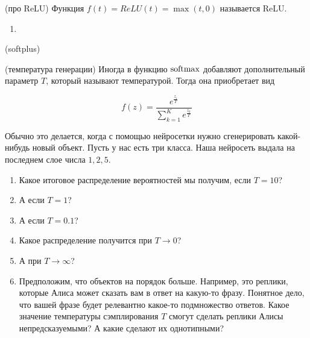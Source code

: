 \begin{problem}{(про ReLU)}
	Функция $f(t) = ReLU(t) = \max(t, 0)$ называется ReLU.
	\begin{enumerate}
        \item 
	\end{enumerate}
\end{problem} 





\begin{problem}{(softplus)}
\end{problem}




\begin{problem}{(температура генерации)}
	Иногда в функцию $\operatorname{softmax}$ добавляют дополнительный параметр $T$, который называют температурой. Тогда она приобретает вид 
	
	$$ 
	f(z) =  \frac{e^{\tfrac{z_i}{T}}}{ \sum_{k=1}^K e^{\tfrac{z_k}{T}}}
	$$

	Обычно это делается, когда с помощью нейросетки нужно сгенерировать какой-нибудь новый объект.  Пусть у нас есть три класса. Наша нейросеть выдала на последнем слое числа $1,2,5$. 

	\begin{enumerate}
		\item  Какое итоговое распределение вероятностей мы получим, если $T = 10$? 
		\item  А если $T = 1$? 
		\item  А если $T = 0.1$? 
		\item  Какое распределение получится при $T \to 0$? 
		\item  А при $T \to \infty$? 
		\item  Предположим, что объектов на порядок больше. Например, это реплики, которые Алиса может сказать вам в ответ на какую-то фразу.  Понятное дело, что вашей фразе будет релевантно какое-то подмножество ответов. Какое значение температуры сэмплирования $T$ смогут сделать реплики Алисы непредсказуемыми? А какие сделают их однотипными? 
	\end{enumerate}
\end{problem}



